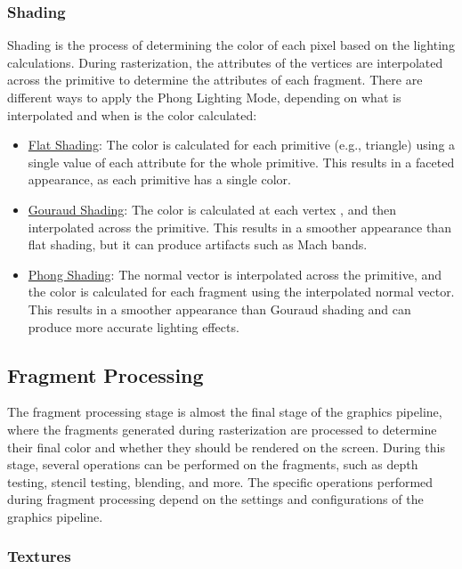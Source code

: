 \subsubsection{Shading}

Shading is the process of determining the color of each pixel based on the lighting calculations. During rasterization, the attributes of the vertices are interpolated across the primitive to determine the attributes of each fragment. There are different ways to apply the Phong Lighting Mode, depending on what is interpolated and when is the color calculated:
\begin{itemize}
    \item \ul{Flat Shading}: The color is calculated for each primitive (e.g., triangle) using a single value of each attribute for the whole primitive. This results in a faceted appearance, as each primitive has a single color.
    \item \ul{Gouraud Shading}: The color is calculated at each vertex , and then interpolated across the primitive. This results in a smoother appearance than flat shading, but it can produce artifacts such as Mach bands.
    \item \ul{Phong Shading}: The normal vector is interpolated across the primitive, and the color is calculated for each fragment using the interpolated normal vector. This results in a smoother appearance than Gouraud shading and can produce more accurate lighting effects.
\end{itemize}

\subsection{Fragment Processing}

The fragment processing stage is almost the final stage of the graphics pipeline, where the fragments generated during rasterization are processed to determine their final color and whether they should be rendered on the screen. During this stage, several operations can be performed on the fragments, such as depth testing, stencil testing, blending, and more. The specific operations performed during fragment processing depend on the settings and configurations of the graphics pipeline.

\subsubsection{Textures}

